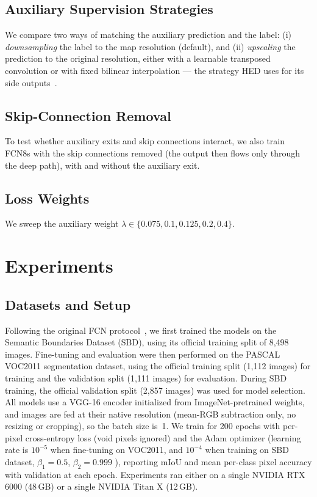 \documentclass[runningheads]{llncs}
\begin{document}
    \subsection{Auxiliary Supervision Strategies}
    
    We compare two ways of matching the auxiliary prediction and the label:
    (i) \emph{downsampling} the label to the map resolution (default), and
    (ii) \emph{upscaling} the prediction to the original resolution, either with a
    learnable transposed convolution or with fixed bilinear interpolation --- the
    strategy HED uses for its side outputs~\cite{ref_hed}.

    \subsection{Skip-Connection Removal}
    
    To test whether auxiliary exits and skip connections interact, we also train
    FCN8s with the skip connections removed (the output then flows only through
    the deep path), with and without the auxiliary exit.
    
    \subsection{Loss Weights}
    We sweep the auxiliary weight $\lambda \in \{0.075, 0.1, 0.125, 0.2, 0.4\}$.

\section{Experiments}

    \subsection{Datasets and Setup}

    Following the original FCN protocol~\cite{ref_fcn}, we first trained the models on the Semantic Boundaries Dataset (SBD), using its official training split of 8,498 images. Fine-tuning and evaluation were then performed on the PASCAL VOC2011 segmentation dataset, using the official training split (1,112 images) for training and the validation split (1,111 images) for evaluation. During SBD training, the official validation split (2,857 images) was used for model selection.
    All models use a VGG-16 encoder initialized from ImageNet-pretrained weights, and
    images are fed at their native resolution (mean-RGB subtraction only, no resizing
    or cropping), so the batch size is~1. We train for 200 epochs with per-pixel
    cross-entropy loss (void pixels ignored) and the Adam optimizer (learning rate is 
    $10^{-5}$ when fine-tuning on VOC2011, and $10^{-4}$ when training on SBD dataset,
    $\beta_1{=}0.5$, $\beta_2{=}0.999$
    ), reporting mIoU and mean per-class
    pixel accuracy with validation at each epoch. Experiments ran either on a single
    NVIDIA RTX 6000 (48\,GB) or a single NVIDIA Titan X (12\,GB).
    
\end{document}
